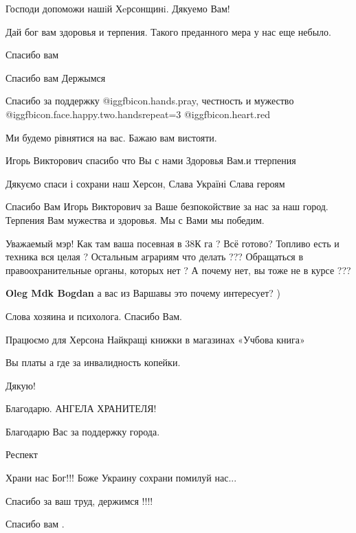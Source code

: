\begin{itemize}
Господи допоможи нашiй Хeрсонщинi. Дякуемо Вам!

Дай бог вам здоровья и терпения. Такого преданного мера у нас еще небыло.

Спасибо вам

Спасибо вам
Держымся

Спасибо за поддержку  @igg{fbicon.hands.pray}, честность и мужество @igg{fbicon.face.happy.two.hands}{repeat=3} @igg{fbicon.heart.red}

Ми будемо рівнятися на вас. Бажаю вам вистояти.

Игорь Викторович спасибо что Вы с нами Здоровья Вам.и ттерпения

Дякуємо спаси і сохрани наш Херсон, Слава Україні Слава героям


Спасибо Вам Игорь Викторович за Ваше безпокойствие за нас за наш город.
Терпения Вам мужества и здоровья. Мы с Вами мы победим.


Уважаемый мэр! Как там ваша посевная в 38К га ? Всё готово? Топливо есть и
техника вся целая ? Остальным аграриям что делать ??? Обращаться в
правоохранительные органы, которых нет ? А почему нет, вы тоже не в курсе ???

\textbf{Oleg Mdk Bogdan} а вас из Варшавы это почему интересует? )

Слова хозяина и психолога. Спасибо Вам.

Працюємо для Херсона
Найкращі книжки в магазинах «Учбова книга»

Вы платы а где за инвалидность копейки.

Дякую!

Благодарю. АНГЕЛА ХРАНИТЕЛЯ!

Благодарю Вас за поддержку города.

Респект

Храни нас Бог!!! Боже Украину сохрани помилуй нас...


Спасибо за ваш труд, держимся !!!!

Спасибо вам .


\end{itemize}

